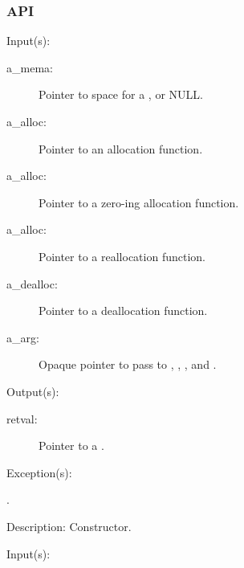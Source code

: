\subsubsection{API}
\begin{capi}
\label{mema_new}
	\begin{capilist}
	\item[Input(s): ]
		\begin{description}\item[]
		\item[a\_mema: ]
			Pointer to space for a , or NULL.
		\item[a\_alloc: ]
			Pointer to an allocation function.
		\item[a\_alloc: ]
			Pointer to a zero-ing allocation function.
		\item[a\_alloc: ]
			Pointer to a reallocation function.
		\item[a\_dealloc: ]
			Pointer to a deallocation function.
		\item[a\_arg: ]
			Opaque pointer to pass to ,
			, , and
			.
		\end{description}
	\item[Output(s): ]
		\begin{description}\item[]
		\item[retval: ]
			Pointer to a .
		\end{description}
	\item[Exception(s): ]
		\begin{description}\item[]
		\item[.]
		\end{description}
	\item[Description: ]
		Constructor.
	\end{capilist}
\label{mema_delete}
	\begin{capilist}
	\item[Input(s): ]
		\begin{description}\item[]

\end{description}
\end{capilist}
\end{capi}
